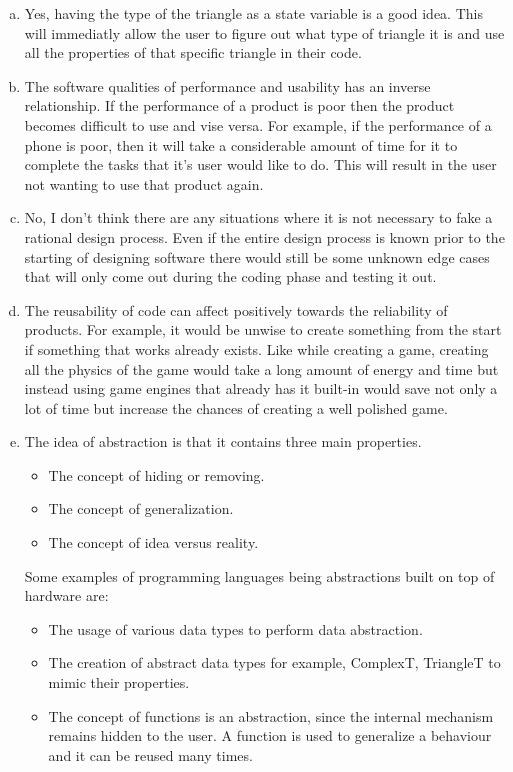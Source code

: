\documentclass[12pt]{article}
\begin{document}
\begin{enumerate}[(a)]
	\item Yes, having the type of the triangle as a state variable is a good idea. This will immediatly allow the user to figure out what type of triangle it is and use all the properties of that specific triangle in their code. 

	\item The software qualities of performance and usability has an inverse relationship. If the performance of a product is poor then the product becomes difficult to use and vise versa. For example, if the performance of a phone is poor, then it will take a considerable amount of time for it to complete the tasks that it's user would like to do. This will result in the user not wanting to use that product again.

	\item No, I don't think there are any situations where it is not necessary to fake a rational design process. Even if the entire design process is known prior to the starting of designing software there would still be some unknown edge cases that will only come out during the coding phase and testing it out. 

	\item The reusability of code can affect positively towards the reliability of products. For example, it would be unwise to create something from the start if something that works already exists. Like while creating a game, creating all the physics of the game would take a long amount of energy and time but instead using game engines that already has it built-in would save not only a lot of time but increase the chances of creating a well polished game.

	\item The idea of abstraction is that it contains three main properties.
	\begin{itemize}
		\item The concept of hiding or removing. 
		\item The concept of generalization.
		\item The concept of idea versus reality.
	\end{itemize} 
	Some examples of programming languages being abstractions built on top of hardware are:
	\begin{itemize}
		\item The usage of various data types to perform data abstraction.
		\item The creation of abstract data types for example, ComplexT, TriangleT to mimic their properties.
		\item The concept of functions is an abstraction, since the internal mechanism remains hidden to the user. A function is used to generalize a behaviour and it can be reused many times.
	\end{itemize}

\end{enumerate}
\end{document}
